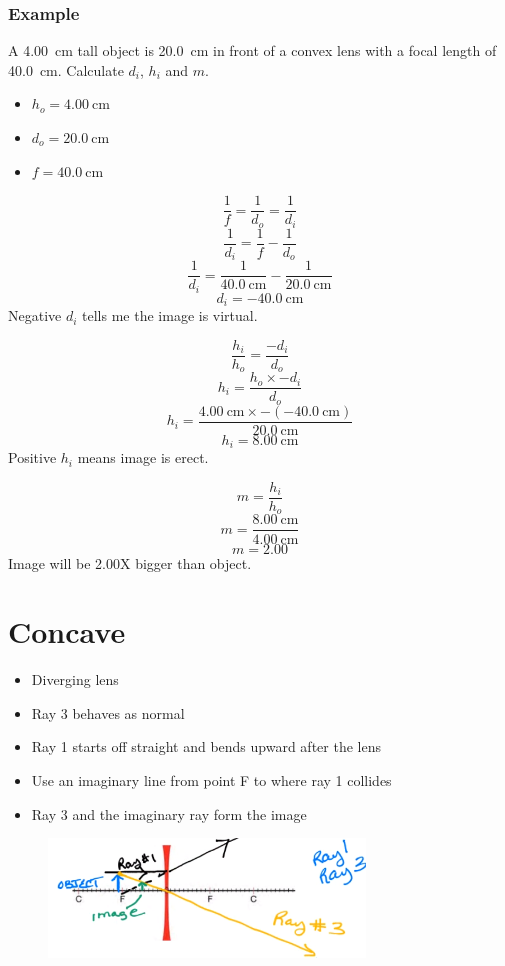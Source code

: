 \documentclass[a4paper,12pt]{article}
\begin{document}
\subsubsection{Example}
A \SI{4.00}{\cm} tall object is \SI{20.0}{\cm} in front of a convex lens with a focal length of \SI{40.0}{\cm}. Calculate $d_i$, $h_i$ and $m$.
\begin{itemize}
    \item{$h_o = \SI{4.00}{\cm}$}
    \item{$d_o = \SI{20.0}{\cm}$}
    \item{$f = \SI{40.0}{\cm}$}
\end{itemize}
$$\frac{1}{f} = \frac{1}{d_o} = \frac{1}{d_i}$$
$$\frac{1}{d_i} = \frac{1}{f} - \frac{1}{d_o}$$
$$\frac{1}{d_i} = \frac{1}{\SI{40.0}{\cm}} - \frac{1}{\SI{20.0}{\cm}}$$
$$d_i = \SI{-40.0}{\cm}$$
Negative $d_i$ tells me the image is virtual.

$$\frac{h_i}{h_o} = \frac{-d_i}{d_o}$$
$$h_i = \frac{h_o \times -d_i}{d_o}$$
$$h_i = \frac{\SI{4.00}{\cm} \times -(\SI{-40.0}{\cm})}{\SI{20.0}{\cm}}$$
$$h_i = \SI{8.00}{\cm}$$
Positive $h_i$ means image is erect.

$$m = \frac{h_i}{h_o}$$
$$m = \frac{\SI{8.00}{\cm}}{\SI{4.00}{\cm}}$$
$$m = \num{2.00}$$
Image will be 2.00X bigger than object.

\pagebreak
\section{Concave}
\begin{itemize}
    \item{Diverging lens}
    \item{Ray 3 behaves as normal}
    \item{Ray 1 starts off straight and bends upward after the lens}
    \item{Use an imaginary line from point F to where ray 1 collides}
    \item{Ray 3 and the imaginary ray form the image}
\end{itemize}

\begin{figure}[H]
    \centering
    \includegraphics[width=0.75\textwidth]{concave-atf}
\end{figure}
\end{document}
